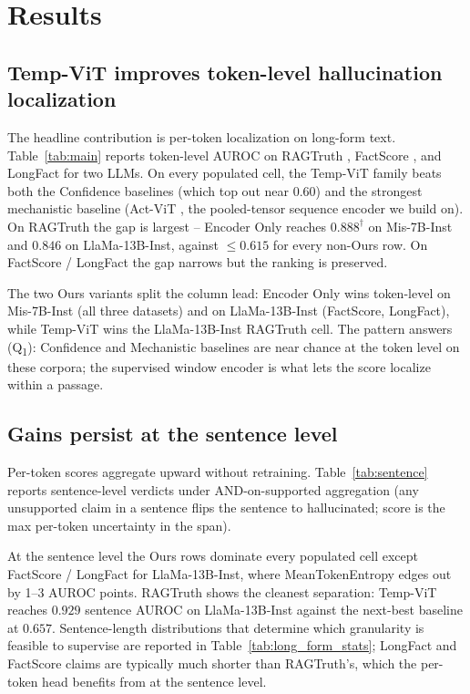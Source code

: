 \section{Results}
\label{sec:results}



\subsection{Temp-ViT improves token-level hallucination
localization}
\label{sec:results_token}

The headline contribution is per-token localization on long-form
text. Table~\ref{tab:main} reports token-level AUROC on RAGTruth
\citep{niu2024ragtruth}, FactScore \citep{min2023}, and LongFact
\citep{wei2024} for two LLMs. On every populated cell, the
Temp-ViT family beats both the Confidence baselines (which top out
near 0.60) and the strongest mechanistic baseline (Act-ViT
\citep{barshalom2025}, the pooled-tensor sequence encoder we build
on). On RAGTruth the gap is largest -- Encoder Only reaches
$0.888^\dagger$ on Mis-7B-Inst and $0.846$ on LlaMa-13B-Inst,
against $\leq 0.615$ for every non-Ours row. On FactScore /
LongFact the gap narrows but the ranking is preserved.

The two Ours variants split the column lead: Encoder Only
wins token-level on Mis-7B-Inst (all three datasets) and on
LlaMa-13B-Inst (FactScore, LongFact), while Temp-ViT wins
the LlaMa-13B-Inst RAGTruth cell. The pattern answers
(Q\textsubscript{1}): Confidence and Mechanistic baselines are
near chance at the token level on these corpora; the supervised
window encoder is what lets the score localize within a passage.

\subsection{Gains persist at the sentence level}
\label{sec:results_aggregated}

Per-token scores aggregate upward without retraining.
Table~\ref{tab:sentence} reports sentence-level verdicts under
AND-on-supported aggregation (any unsupported claim in a sentence
flips the sentence to hallucinated; score is the max per-token
uncertainty in the span).

At the sentence level the Ours rows dominate every populated cell
except FactScore / LongFact for LlaMa-13B-Inst, where MeanTokenEntropy
edges out by 1--3 AUROC points. RAGTruth shows the cleanest
separation: Temp-ViT reaches $0.929$ sentence AUROC on
LlaMa-13B-Inst against the next-best baseline at $0.657$.
Sentence-length distributions
that determine which granularity is feasible to supervise are
reported in Table~\ref{tab:long_form_stats}; LongFact and
FactScore claims are typically much shorter than RAGTruth's,
which the per-token head benefits from at the sentence level.
